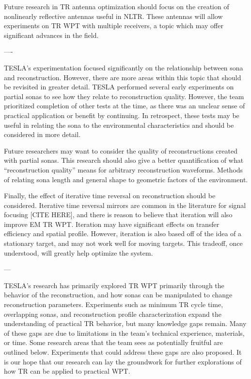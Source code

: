 Future research in TR antenna optimization should focus on the creation of nonlinearly reflective antennas useful in NLTR.  These antennas will allow experiments on TR WPT with multiple receivers, a topic which may offer significant advances in the field.

----

TESLA’s experimentation focused significantly on the relationship between sona and reconstruction.  However, there are more areas within this topic that should be revisited in greater detail.  TESLA performed several early experiments on partial sonas to see how they relate to reconstruction quality.  However, the team prioritized completion of other tests at the time, as there was an unclear sense of practical application or benefit by continuing.  In retrospect, these tests may be useful in relating the sona to the environmental characteristics and should be considered in more detail.

Future researchers may want to consider the quality of reconstructions created with partial sonas.  This research should also give a better quantification of what “reconstruction quality” means for arbitrary reconstruction waveforms.  Methods of relating sona length and general shape to geometric factors of the environment.

Finally, the effect of iterative time reversal on reconstruction should be considered.  Iterative time reversal mirrors are common in the literature for signal focusing [CITE HERE], and there is reason to believe that iteration will also improve EM TR WPT.  Iteration may have significant effects on transfer efficiency and spatial profile.  However, iteration is also based off of the idea of a stationary target, and may not work well for moving targets.  This tradeoff, once understood, will greatly help optimize the system.

---

TESLA’s research has primarily explored TR WPT primarily through the behavior of the reconstruction, and how sonas can be manipulated to change reconstruction parameters.  Experiments such as minimum TR cycle time, overlapping sonas, and reconstruction profile characterization expand the understanding of practical TR behavior, but many knowledge gaps remain.  Many of these gaps are due to limitations in the team’s technical experience, materials, or time.  Some research areas that the team sees as potentially fruitful are outlined below.  Experiments that could address these gaps are also proposed.  It is our hope that our research can lay the groundwork for further explorations of how TR can be applied to practical WPT.

